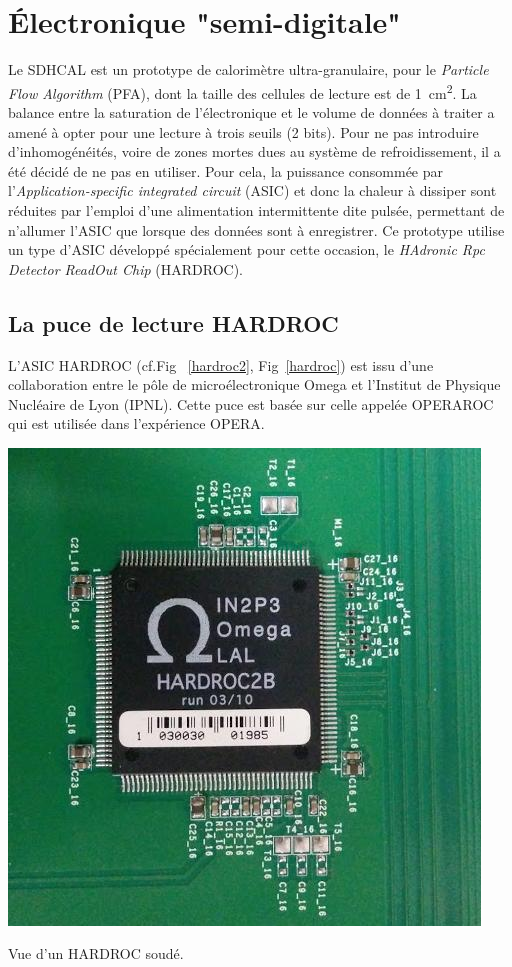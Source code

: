 \section{Électronique "semi-digitale"}
Le SDHCAL est un prototype de calorimètre ultra-granulaire, pour le \textit{Particle Flow Algorithm} (PFA), dont la taille des cellules de lecture est de \SI{1}{\square\centi\meter}. La balance entre la saturation de l'électronique et le volume de données à traiter a amené à opter pour une lecture à trois seuils (\num{2} bits). Pour ne pas introduire d'inhomogénéités, voire de zones mortes dues au système de refroidissement, il a été décidé de ne pas en utiliser. Pour cela, la puissance consommée par l'\textit{Application-specific integrated circuit} (ASIC) et donc la chaleur à dissiper sont réduites par l'emploi d'une alimentation intermittente dite pulsée, permettant de n'allumer l'ASIC que lorsque des données sont à enregistrer. Ce prototype utilise un type d'ASIC développé spécialement pour cette occasion, le \textit{HAdronic Rpc Detector ReadOut Chip }(HARDROC)\cite{Dulucq:2010ssa}.

\subsection{La puce de lecture HARDROC}
L'ASIC HARDROC (cf.Fig~ \ref{hardroc2}, Fig~\ref{hardroc}) est issu d'une collaboration entre le pôle de microélectronique Omega et l'Institut de Physique Nucléaire de Lyon (IPNL). Cette puce est basée sur celle appelée OPERAROC qui est utilisée dans l'expérience OPERA.

\marginpar
{
	\centering
	\includegraphics[width=\marginparwidth]{GLA/hardroc2.jpg}
	\captionsetup{type=figure}\caption{Vue d'un HARDROC soudé.}
	\label{hardroc2}
}

